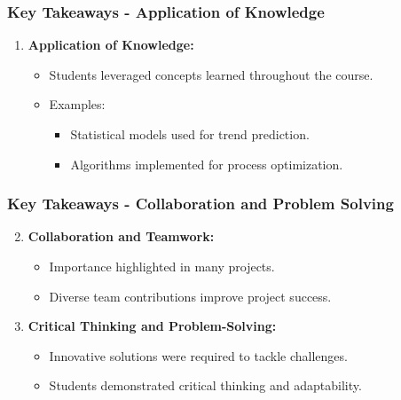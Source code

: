 \documentclass[aspectratio=169]{beamer}
\begin{document}
\begin{frame}[fragile]
    \frametitle{Key Takeaways - Application of Knowledge}
    \begin{enumerate}
        \item \textbf{Application of Knowledge:}
        \begin{itemize}
            \item Students leveraged concepts learned throughout the course.
            \item Examples:
            \begin{itemize}
                \item Statistical models used for trend prediction.
                \item Algorithms implemented for process optimization.
            \end{itemize}
        \end{itemize}
    \end{enumerate}
\end{frame}

\begin{frame}[fragile]
    \frametitle{Key Takeaways - Collaboration and Problem Solving}
    \begin{enumerate}
        \setcounter{enumi}{1}
        \item \textbf{Collaboration and Teamwork:}
        \begin{itemize}
            \item Importance highlighted in many projects.
            \item Diverse team contributions improve project success.
        \end{itemize}
        
        \item \textbf{Critical Thinking and Problem-Solving:}
        \begin{itemize}
            \item Innovative solutions were required to tackle challenges.
            \item Students demonstrated critical thinking and adaptability.
        \end{itemize}
    \end{enumerate}
\end{frame}
\end{document}
